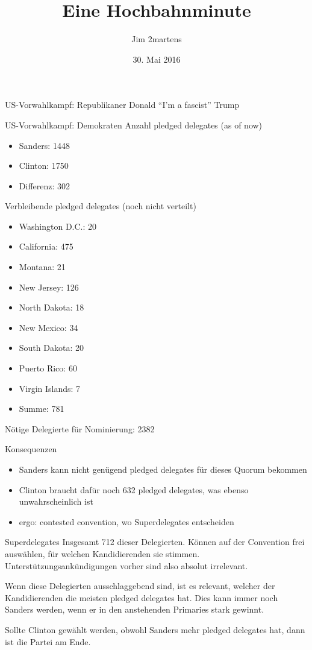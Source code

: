 \documentclass{beamer}
\begin{document}
\author{Jim 2martens}
\title{Eine Hochbahnminute}
\date{30. Mai 2016}

\begin{frame}
  \titlepage
\end{frame}

\begin{frame}{US-Vorwahlkampf: Republikaner}
  \centering
  Donald "`I'm a fascist"' Trump
\end{frame}

\begin{frame}{US-Vorwahlkampf: Demokraten}
  Anzahl pledged delegates (as of now)
  \begin{itemize}
    \item Sanders: 1448
    \item Clinton: 1750
    \item Differenz: 302
  \end{itemize}

  Verbleibende pledged delegates (noch nicht verteilt)
  \begin{itemize}
    \item Washington D.C.: 20
    \item California: 475
    \item Montana: 21
    \item New Jersey: 126
    \item North Dakota: 18
    \item New Mexico: 34
    \item South Dakota: 20
    \item Puerto Rico: 60
    \item Virgin Islands: 7
    \item Summe: 781
  \end{itemize}

  Nötige Delegierte für Nominierung: 2382
\end{frame}

\begin{frame}{Konsequenzen}
  \begin{itemize}
    \item Sanders kann nicht genügend pledged delegates für dieses Quorum bekommen
    \item Clinton braucht dafür noch 632 pledged delegates, was ebenso unwahrscheinlich ist
    \item ergo: contested convention, wo Superdelegates entscheiden
  \end{itemize}
\end{frame}

\begin{frame}{Superdelegates}
  Insgesamt 712 dieser Delegierten. Können auf der Convention frei auswählen, für welchen
  Kandidierenden sie stimmen. Unterstützungsankündigungen vorher sind also absolut
  irrelevant.

  Wenn diese Delegierten ausschlaggebend sind, ist es relevant, welcher der Kandidierenden
  die meisten pledged delegates hat. Dies kann immer noch Sanders werden, wenn er in den 
  anstehenden Primaries stark gewinnt.

  Sollte Clinton gewählt werden, obwohl Sanders mehr pledged delegates hat, dann ist die
  Partei am Ende.
\end{frame}
\end{document}
